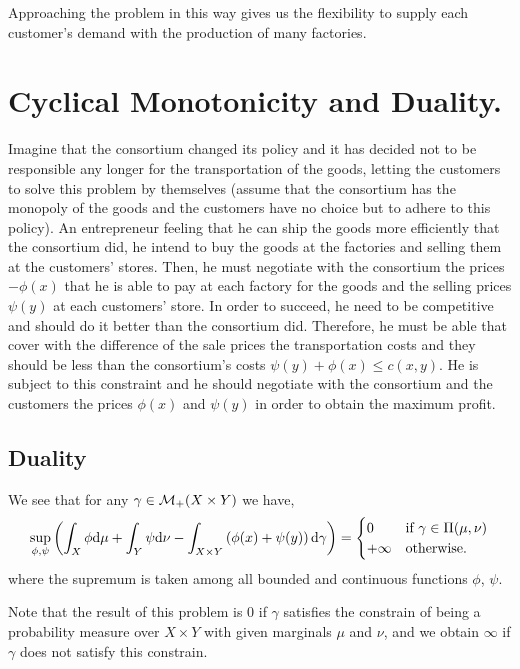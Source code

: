 Approaching the problem in this way gives us the flexibility to supply each customer's demand with the production of many factories.  

\section{Cyclical Monotonicity and Duality.}

Imagine that the consortium changed its policy and it has decided not to be responsible any longer for the transportation of the goods, letting the customers to solve this problem by themselves (assume that the consortium has the monopoly of the goods and the customers have no choice but to adhere to this policy). An entrepreneur feeling that he can ship the goods more efficiently that the consortium did, he intend to buy the goods at the factories and selling them at the customers' stores. Then, he must negotiate with the consortium the prices $-\phi(x)$ that he is able to pay at each factory for the goods and the selling prices $\psi(y)$ at each customers' store. In order to succeed, he need to be competitive and should do it better than the consortium did. Therefore, he must be able that cover with the difference of the sale prices the transportation costs and they should be less than the consortium's costs $\psi(y)+\phi(x)\leq c(x,y)$. He is subject to this constraint and he should negotiate with the consortium and the customers the prices $\phi(x)$ and $\psi(y)$ in order to obtain the maximum profit.


\subsection{Duality}
We see that for any $\gamma \in \mathcal{M}_+(X\times Y)$ we have,
\begin{equation}
\sup_{\phi, \psi} \left( \int_X \phi\mathrm{d}\mu +\int_Y\psi\mathrm{d}\nu-\int_{X\times Y}\left( \phi(x)+\psi(y) \right)\mathrm{d} \gamma \right) = \begin{cases}
0 & \text{if } \gamma \in \Pi(\mu, \nu) \\
+\infty & \text{otherwise}.	
\end{cases}\label{eq: Constrain indicator}
\end{equation}
where the supremum is taken among all bounded and continuous functions $\phi$, $\psi$. 

Note that the result of this problem is $0$ if $\gamma$ satisfies the constrain of being a probability measure over $X\times Y$ with given marginals $\mu$ and $\nu$, and we obtain $\infty$ if $\gamma$ does not satisfy this constrain.

